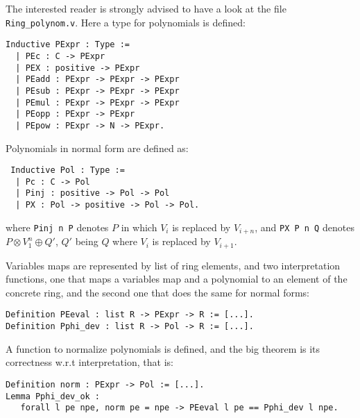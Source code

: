The interested reader is strongly advised to have a look at the file
\texttt{Ring\_polynom.v}. Here a type for polynomials is defined: 

\begin{small}
\begin{flushleft}
\begin{verbatim}
Inductive PExpr : Type :=
  | PEc : C -> PExpr
  | PEX : positive -> PExpr
  | PEadd : PExpr -> PExpr -> PExpr
  | PEsub : PExpr -> PExpr -> PExpr
  | PEmul : PExpr -> PExpr -> PExpr
  | PEopp : PExpr -> PExpr
  | PEpow : PExpr -> N -> PExpr.
\end{verbatim}
\end{flushleft}
\end{small}

Polynomials in normal form are defined as:
\begin{small}
\begin{flushleft}
\begin{verbatim}
 Inductive Pol : Type :=
  | Pc : C -> Pol 
  | Pinj : positive -> Pol -> Pol                   
  | PX : Pol -> positive -> Pol -> Pol.
\end{verbatim}
\end{flushleft}
\end{small}
where {\tt Pinj n P} denotes $P$ in which $V_i$ is replaced by
$V_{i+n}$, and {\tt PX P n Q} denotes $P \otimes V_1^{n} \oplus Q'$,
$Q'$ being $Q$ where $V_i$ is replaced by $V_{i+1}$. 


Variables maps are represented by list of ring elements, and two
interpretation functions, one that maps a variables map and a
polynomial to an element of the concrete ring, and the second one that
does the same for normal forms:
\begin{small}
\begin{flushleft}
\begin{verbatim}
Definition PEeval : list R -> PExpr -> R := [...].
Definition Pphi_dev : list R -> Pol -> R := [...].
\end{verbatim}
\end{flushleft}
\end{small}

A function to normalize polynomials is defined, and the big theorem is
its correctness w.r.t interpretation, that is:

\begin{small}
\begin{flushleft}
\begin{verbatim}
Definition norm : PExpr -> Pol := [...].
Lemma Pphi_dev_ok :
   forall l pe npe, norm pe = npe -> PEeval l pe == Pphi_dev l npe.
\end{verbatim}
\end{flushleft}
\end{small}

